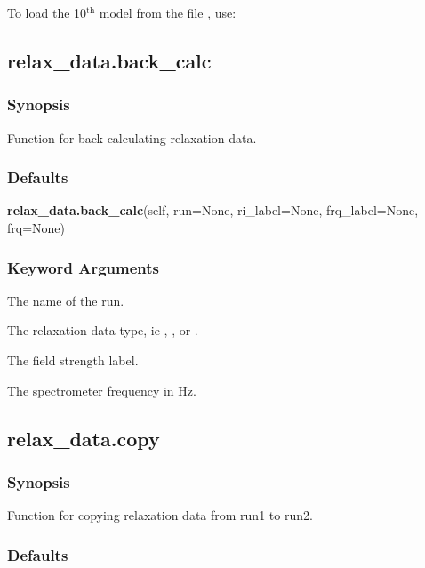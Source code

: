 To load the 10$^\mathrm{th}$ model from the file 
, use:





\newpage

\subsection{relax\_data.back\_calc}


\subsubsection{Synopsis}

Function for back calculating relaxation data.

\subsubsection{Defaults}

\textsf{\textbf{relax\_data.back\_calc}(self, run=None, ri\_label=None, frq\_label=None, frq=None)}


\subsubsection{Keyword Arguments}


  The name of the run.

  The relaxation data type, ie 
, 
, or 
.

  The field strength label.

  The spectrometer frequency in Hz.


\newpage

\subsection{relax\_data.copy}


\subsubsection{Synopsis}

Function for copying relaxation data from run1 to run2.

\subsubsection{Defaults}

